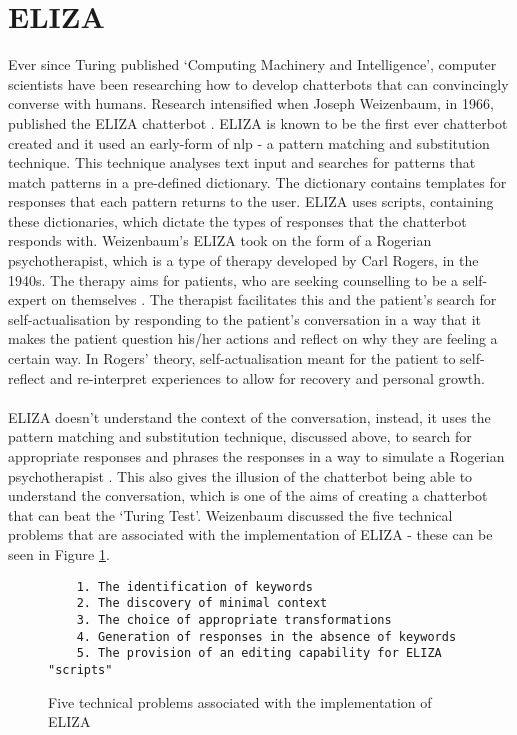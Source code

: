 \section{ELIZA}
Ever since Turing published `Computing Machinery and Intelligence', computer scientists have been researching how to develop chatterbots that can convincingly converse with humans. Research intensified when Joseph Weizenbaum, in 1966, published the ELIZA chatterbot \autocite{weizenbaum-eliza1966}. ELIZA is known to be the first ever chatterbot created and it used an early-form of \gls{nlp} - a pattern matching and substitution technique. This technique analyses text input and searches for patterns that match patterns in a pre-defined dictionary. The dictionary contains templates for responses that each pattern returns to the user. ELIZA uses scripts, containing these dictionaries, which dictate the types of responses that the chatterbot responds with. Weizenbaum's ELIZA took on the form of a Rogerian psychotherapist, which is a type of therapy developed by Carl Rogers, in the 1940s. The therapy aims for patients, who are seeking counselling to be a self-expert on themselves \autocite{brooker_2003}. The therapist facilitates this and the patient's search for self-actualisation by responding to the patient's conversation in a way that it makes the patient question his/her actions and reflect on why they are feeling a certain way. In Rogers' theory, self-actualisation meant for the patient to self-reflect and re-interpret experiences to allow for recovery and personal growth.\\\\
ELIZA doesn't understand the context of the conversation, instead, it uses the pattern matching and substitution technique, discussed above, to search for appropriate responses and phrases the responses in a way to simulate a Rogerian psychotherapist \autocite{shum2018eliza}. This also gives the illusion of the chatterbot being able to understand the conversation, which is one of the aims of creating a chatterbot that can beat the `Turing Test'. Weizenbaum discussed the five technical problems that are associated with the implementation of ELIZA - these can be seen in Figure \ref{fig:five-problems-eliza}.\\
\begin{figure}[H]
	\centering
	\hspace*{-2cm} 
	\begin{BVerbatim}
	1. The identification of keywords
	2. The discovery of minimal context
	3. The choice of appropriate transformations
	4. Generation of responses in the absence of keywords
	5. The provision of an editing capability for ELIZA "scripts"
	\end{BVerbatim}
	
	\caption{Five technical problems associated with the implementation of ELIZA \autocite{weizenbaum-eliza1966}}
	\label{fig:five-problems-eliza}
\end{figure}

